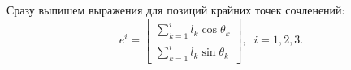 \documentclass[../../doc.tex]{subfiles}
\begin{document}
    Сразу выпишем выражения для позиций крайних точек сочленений:
    \begin{equation}
        e^{i} =
        \begin{bmatrix}
            \sum_{k = 1}^{i} l_k \cos \theta_k \\
            \sum_{k = 1}^{i} l_k \sin \theta_k
        \end{bmatrix},
        \;\;
        i = 1,2,3.
    \end{equation}

    \ifSubfilesClassLoaded{
        \nocite{*}
        \clearpage
        
        
    }{}
\end{document}
